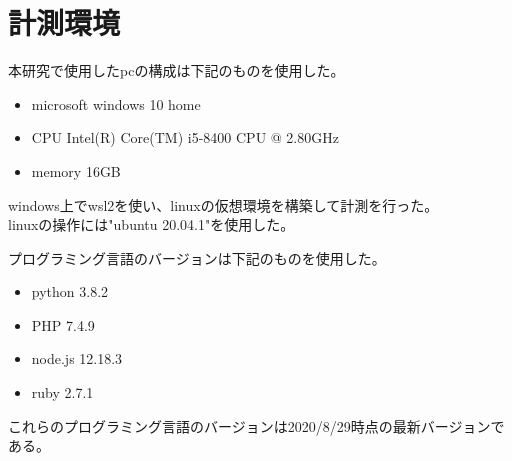 \chapter{計測環境}
\label{cha:environment}
本研究で使用したpcの構成は下記のものを使用した。
\begin{itemize}
  \item microsoft windows 10 home
  \item CPU Intel(R) Core(TM) i5-8400 CPU @ 2.80GHz
  \item memory 16GB
\end{itemize}

windows上でwsl2を使い、linuxの仮想環境を構築して計測を行った。\\
linuxの操作には"ubuntu 20.04.1"を使用した。

プログラミング言語のバージョンは下記のものを使用した。
\begin{itemize}
  \item python 3.8.2
  \item PHP 7.4.9
　\item node.js 12.18.3
  \item ruby 2.7.1
\end{itemize}
これらのプログラミング言語のバージョンは2020/8/29時点の最新バージョンである。